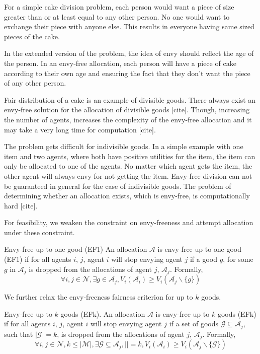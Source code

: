 For a simple cake division problem, each person would want a piece of size greater than or at least equal to any other person. No one would want to exchange their piece with anyone else. This results in everyone having same sized pieces of the cake.

In the extended version of the problem, the idea of envy should reflect the age of the person. In an envy-free allocation, each person will have a piece of cake according to their own age and ensuring the fact that they don't want the piece of any other person. 

Fair distribution of a cake is an example of divisible goods. There always exist an envy-free solution for the allocation of divisible goods [cite]. Though, increasing the number of agents, increases the complexity of the envy-free allocation and it may take a very long time for computation [cite].

The problem gets difficult for indivisible goods. In a simple example with one item and two agents, where both have positive utilities for the item, the item can only be allocated to one of the agents. No matter which agent gets the item, the other agent will always envy for not getting the item. Envy-free division can not be guaranteed in general for the case of indivisible goods. The problem of determining whether an allocation exists, which is envy-free, is computationally hard [cite].

For feasibility, we weaken the constraint on envy-freeness and attempt allocation under these constraint.

\begin{definition}{Envy-free up to one good (EF1) \cite{caragiannis2016unreasonable}}
An allocation $\mathcal{A}$ is envy-free up to one good (EF1) if for all agents $i$, $j$, agent $i$ will stop envying agent $j$ if a good $g$, for some $g$ in $\mathcal{A}_j$ is dropped from the allocations of agent $j$, $\mathcal{A}_j$. Formally,
$$
    \forall i,j \in \mathcal{N}, \exists g \in \mathcal{A}_j, V_i(\mathcal{A}_i) \geq V_i(\mathcal{A}_j \backslash \{g\})
$$
\end{definition}

We further relax the envy-freeness fairness criterion for up to $k$ goods.

\begin{definition}{Envy-free up to $k$ goods (EFk).}
An allocation $\mathcal{A}$ is envy-free up to $k$ goods (EFk) if for all agents $i$, $j$, agent $i$ will stop envying agent $j$ if a set of goods $\mathcal{G} \subseteq \mathcal{A}_j$, such that $|\mathcal{G}| = k$, is dropped from the allocations of agent $j$, $\mathcal{A}_j$. Formally,
$$
    \forall i,j \in \mathcal{N}, k \leq |\mathcal{M}|, \exists \mathcal{G} \subseteq \mathcal{A}_j, || = k, V_i(\mathcal{A}_i) \geq V_i(\mathcal{A}_j \backslash \{\mathcal{G}\})
$$
\end{definition}


